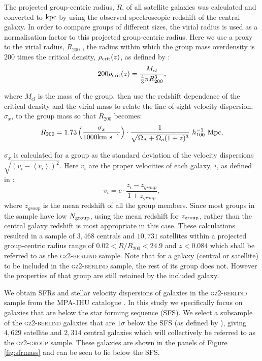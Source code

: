 \documentclass[useAMS,usenatbib]{mn2e}
\begin{document}
The projected group-centric radius, $R$, of all satellite galaxies was calculated and converted to $\rm{kpc}$ by using the observed spectroscopic redshift of the central galaxy. In order to compare groups of different sizes, the virial radius is used as a normalisation factor to this projected group-centric radius. Here we use a proxy to the virial radius, $R_{200}$ \citep[see][]{navarro95}, the radius within which the group mass overdensity is 200 times the critical density, $\rho_{\rm{crit}}(z)$, as defined by \citealt{finn05}:
\begin{equation}\label{eq:overdense}
200\rho_{\rm{crit}}(z) = \frac{M_{cl}}{\frac{4}{3}\pi R_{200}^3},
\end{equation}

where $M_{cl}$ is the mass of the group. \citeauthor{finn05} then use the redshift dependence of the critical density and the virial mass to relate the line-of-sight velocity dispersion, $\sigma_x$, to the group mass so that $R_{200}$ becomes:
\begin{equation}\label{eq:r200}
R_{200} = 1.73 \left ( \frac{\sigma_x}{1000 \rm{km}~\rm{s}^{-1}} \right) \cdot \frac{1}{\sqrt{\Omega_{\Lambda} +\Omega_o(1+z)^3}} ~ h_{100}^{-1} ~\rm{Mpc}, 
\end{equation}

$\sigma_x$ is calculated for a group as the standard deviation of the velocity dispersions $\sqrt{(v_i - \left< v_i\right>)^2}$. Here $v_i$ are the proper velocities of each galaxy, $i$, as defined in \cite{danese80}:
\begin{equation}\label{eq:propervel}
v_i = c \cdot \frac{z_i - z_{group}}{1 + z_{group}},
\end{equation}
where $z_{group}$ is the mean redshift of all the group members. Since most groups in the sample have low $N_{\rm{group}}$, using the mean redshift for $z_{\rm{group}}$, rather than the central galaxy redshift is most appropriate in this case. These calculations resulted in a sample of $3,468$ centrals and $10,731$ satellites within a projected group-centric radius range of $0.02 < R/R_{200} < 24.9$ and $z < 0.084$ which shall be referred to as the \textsc{gz2-berlind} sample. Note that for a galaxy (central or satellite) to be included in the \textsc{gz2-berlind} sample, the rest of its group does not. However the properties of that group are still retained by the included galaxy. 

We obtain SFRs and stellar velocity dispersions of galaxies in the \textsc{gz2-berlind} sample from the MPA-JHU catalogue \citep{kauffmann03, brinchmann04}. In this study we specifically focus on galaxies that are below the star forming sequence (SFS). We select a subsample of the \textsc{gz2-berlind} galaxies that are $1\sigma$ below the SFS (as defined by \cite{peng10}), giving $4,629$ satellite and $2,314$ central galaxies which will collectively be referred to as the \textsc{gz2-group} sample. These galaxies are shown in the panels of Figure \ref{fig:sfrmass} and can be seen to lie below the SFS.
\end{document}
